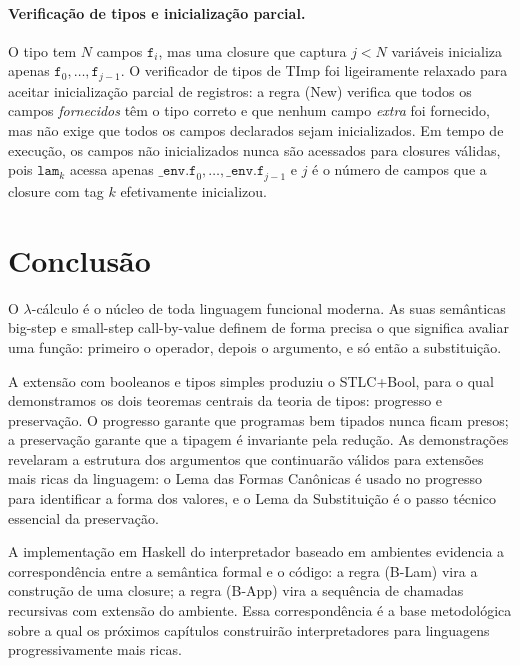 \paragraph{Verificação de tipos e inicialização parcial.}

O tipo  tem \(N\) campos \(\mathtt{f}_i\), mas uma
closure que captura \(j < N\) variáveis inicializa apenas
\(\mathtt{f}_0, \ldots, \mathtt{f}_{j-1}\). O verificador de tipos
de TImp foi ligeiramente relaxado para aceitar inicialização parcial
de registros: a regra (New) verifica que todos os campos
\emph{fornecidos} têm o tipo correto e que nenhum campo
\emph{extra} foi fornecido, mas não exige que todos os campos
declarados sejam inicializados. Em tempo de execução, os campos não
inicializados nunca são acessados para closures válidas, pois
\(\mathtt{lam}_k\) acessa apenas \(\mathtt{\_env.f}_0, \ldots,
\mathtt{\_env.f}_{j-1}\) e \(j\) é o número de campos que a closure
com tag \(k\) efetivamente inicializou.

\section{Conclusão}

O $\lambda$-cálculo é o núcleo de toda linguagem funcional moderna. As
suas semânticas big-step e small-step call-by-value definem de forma
precisa o que significa avaliar uma função: primeiro o operador,
depois o argumento, e só então a substituição.

A extensão com booleanos e tipos simples produziu o STLC+Bool, para o
qual demonstramos os dois teoremas centrais da teoria de tipos:
progresso e preservação. O progresso garante que programas bem
tipados nunca ficam presos; a preservação garante que a tipagem é
invariante pela redução. As demonstrações revelaram a estrutura dos
argumentos que continuarão válidos para extensões mais ricas da
linguagem: o Lema das Formas Canônicas é usado no progresso para
identificar a forma dos valores, e o Lema da Substituição é o passo
técnico essencial da preservação.

A implementação em Haskell do interpretador baseado em ambientes
evidencia a correspondência entre a semântica formal e o código: a
regra (B-Lam) vira a construção de uma closure; a regra (B-App) vira
a sequência de chamadas recursivas com extensão do ambiente. Essa
correspondência é a base metodológica sobre a qual os próximos
capítulos construirão interpretadores para linguagens
progressivamente mais ricas.
